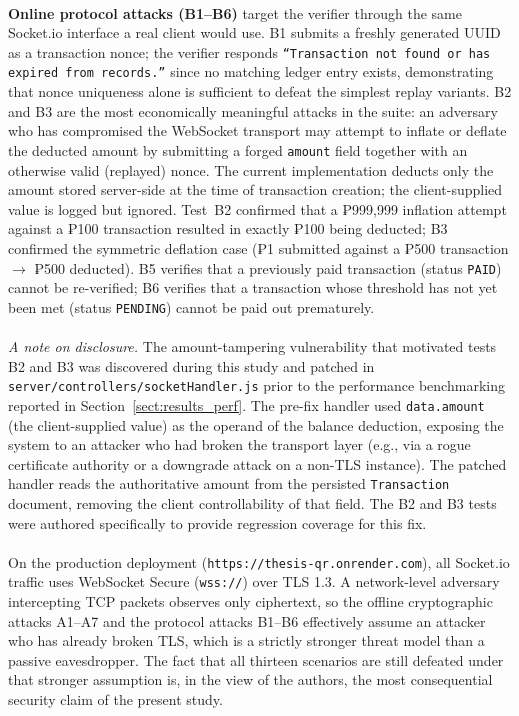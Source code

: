 \paragraph{}\textbf{Online protocol attacks (B1--B6)} target the verifier through the same Socket.io interface a real client would use. B1 submits a freshly generated UUID as a transaction nonce; the verifier responds \texttt{``Transaction not found or has expired from records.''} since no matching ledger entry exists, demonstrating that nonce uniqueness alone is sufficient to defeat the simplest replay variants. B2 and B3 are the most economically meaningful attacks in the suite: an adversary who has compromised the WebSocket transport may attempt to inflate or deflate the deducted amount by submitting a forged \texttt{amount} field together with an otherwise valid (replayed) nonce. The current implementation deducts only the amount stored server-side at the time of transaction creation; the client-supplied value is logged but ignored. Test~B2 confirmed that a ₱999{,}999 inflation attempt against a ₱100 transaction resulted in exactly ₱100 being deducted; B3 confirmed the symmetric deflation case (₱1 submitted against a ₱500 transaction $\to$ ₱500 deducted). B5 verifies that a previously paid transaction (status \texttt{PAID}) cannot be re-verified; B6 verifies that a transaction whose threshold has not yet been met (status \texttt{PENDING}) cannot be paid out prematurely.

\paragraph{}\textit{A note on disclosure.} The amount-tampering vulnerability that motivated tests B2 and B3 was discovered during this study and patched in \texttt{server/controllers/socketHandler.js} prior to the performance benchmarking reported in Section~\ref{sect:results_perf}. The pre-fix handler used \texttt{data.amount} (the client-supplied value) as the operand of the balance deduction, exposing the system to an attacker who had broken the transport layer (e.g., via a rogue certificate authority or a downgrade attack on a non-TLS instance). The patched handler reads the authoritative amount from the persisted \texttt{Transaction} document, removing the client controllability of that field. The B2 and B3 tests were authored specifically to provide regression coverage for this fix.

\paragraph{}On the production deployment (\texttt{https://thesis-qr.onrender.com}), all Socket.io traffic uses WebSocket Secure (\texttt{wss://}) over TLS 1.3. A network-level adversary intercepting TCP packets observes only ciphertext, so the offline cryptographic attacks A1--A7 and the protocol attacks B1--B6 effectively assume an attacker who has already broken TLS, which is a strictly stronger threat model than a passive eavesdropper. The fact that all thirteen scenarios are still defeated under that stronger assumption is, in the view of the authors, the most consequential security claim of the present study.

